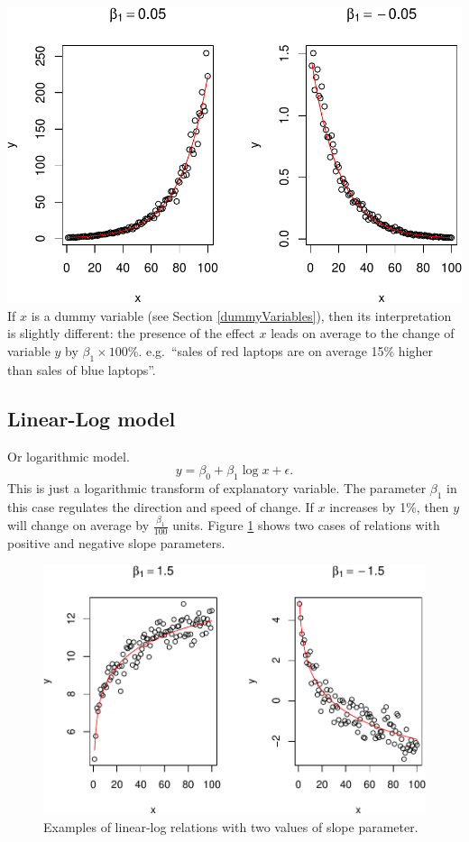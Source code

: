 \documentclass[
]{book}
\theoremstyle{definition}
\theoremstyle{definition}
\theoremstyle{definition}
\theoremstyle{definition}
\theoremstyle{remark}
\begin{document}
\includegraphics{Svetunkov---Statistics-for-Business-Analytics_files/figure-latex/transformationsExamples02-1.pdf}
If \(x\) is a dummy variable (see Section \ref{dummyVariables}), then its interpretation is slightly different: the presence of the effect \(x\) leads on average to the change of variable \(y\) by \(\beta_1 \times 100\)\%. e.g.~``sales of red laptops are on average 15\% higher than sales of blue laptops''.

\subsection{Linear-Log model}\label{linear-log-model}

Or logarithmic model.
\begin{equation}
    y = \beta_0 + \beta_1 \log x + \epsilon .
    \label{eq:transformLinearLog}
\end{equation}
This is just a logarithmic transform of explanatory variable. The parameter \(\beta_1\) in this case regulates the direction and speed of change. If \(x\) increases by 1\%, then \(y\) will change on average by \(\frac{\beta_1}{100}\) units. Figure \ref{fig:transformationsExamples03} shows two cases of relations with positive and negative slope parameters.

\begin{figure}
\centering
\includegraphics{Svetunkov---Statistics-for-Business-Analytics_files/figure-latex/transformationsExamples03-1.pdf}
\caption{\label{fig:transformationsExamples03}Examples of linear-log relations with two values of slope parameter.}
\end{figure}
\end{document}
